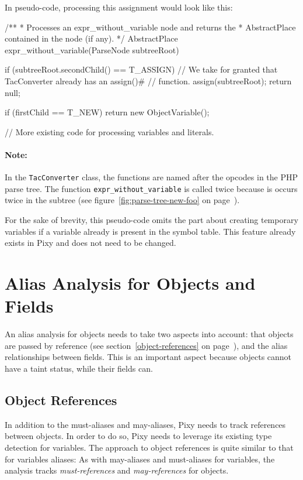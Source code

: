 In pseudo-code, processing this assignment would look like this:

\begin{textcode}
/**
 * Processes an expr_without_variable node and returns the
 * AbstractPlace contained in the node (if any).
 */
AbstractPlace expr_without_variable(ParseNode subtreeRoot) {
  if (subtreeRoot.secondChild() == T_ASSIGN) {
    // We take for granted that TacConverter already has an assign()#
    // function.
    assign(subtreeRoot);
    return null;
  }

  if (firstChild == T_NEW) {
    return new ObjectVariable();
  }

  // More existing code for processing variables and literals.
}
\end{textcode}

\paragraph{Note:} In the \texttt{TacConverter} class, the functions are named after the opcodes in the PHP parse tree. The function \texttt{expr\_without\_variable} is called twice because is occurs twice in the subtree (see figure~\ref{fig:parse-tree-new-foo} on page~\pageref{fig:parse-tree-new-foo}).

For the sake of brevity, this pseudo-code omits the part about creating temporary variables if a variable already is present in the symbol table. This feature already exists in Pixy and does not need to be changed.


\section{Alias Analysis for Objects and Fields}

An alias analysis for objects needs to take two aspects into account: that objects are passed by reference (see section~\ref{object-references} on page~\pageref{object-references}), and the alias relationships between fields. This is an important aspect because objects cannot have a taint status, while their fields can.


\subsection{Object References}

In addition to the must-aliases and may-aliases, Pixy needs to track references between objects. In order to do so, Pixy needs to leverage its existing type detection for variables. The approach to object references is quite similar to that for variables aliases: As with may-aliases and must-aliases for variables, the analysis tracks \emph{must-references} and \emph{may-references} for objects.

